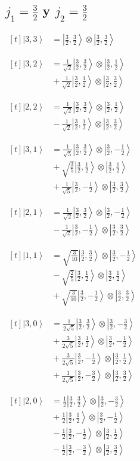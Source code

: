\documentclass[11pt,a4paper]{article}
\newcommand{\estadocelda}[1]{%
  \begin{minipage}[t]{0.48\linewidth}
  \small\raggedright
  \(\displaystyle\begin{aligned}[t]#1\end{aligned}\)
  \end{minipage}%
}
\newcommand{\ket}[1]{\left|#1\right\rangle}
\begin{document}
\subsection{\texorpdfstring{$j_1=\frac{3}{2}$ y $j_2=\frac{3}{2}$}{j1=3/2 y j2=3/2}}

\noindent\estadocelda{
\ket{3,3} &= \ket{\frac{3}{2},\frac{3}{2}}\otimes\ket{\frac{3}{2},\frac{3}{2}}
}\hfill\estadocelda{
\ket{3,2} &= \frac{1}{\sqrt{2}}\ket{\frac{3}{2},\frac{3}{2}}\otimes\ket{\frac{3}{2},\frac{1}{2}} \\
 &{}+\frac{1}{\sqrt{2}}\ket{\frac{3}{2},\frac{1}{2}}\otimes\ket{\frac{3}{2},\frac{3}{2}}
}\par\addvspace{1.4em}

\noindent\estadocelda{
\ket{2,2} &= \frac{1}{\sqrt{2}}\ket{\frac{3}{2},\frac{3}{2}}\otimes\ket{\frac{3}{2},\frac{1}{2}} \\
 &{}-\frac{1}{\sqrt{2}}\ket{\frac{3}{2},\frac{1}{2}}\otimes\ket{\frac{3}{2},\frac{3}{2}}
}\hfill\estadocelda{
\ket{3,1} &= \frac{1}{\sqrt{5}}\ket{\frac{3}{2},\frac{3}{2}}\otimes\ket{\frac{3}{2},-\frac{1}{2}} \\
 &{}+\sqrt{\frac{3}{5}}\ket{\frac{3}{2},\frac{1}{2}}\otimes\ket{\frac{3}{2},\frac{1}{2}} \\
 &{}+\frac{1}{\sqrt{5}}\ket{\frac{3}{2},-\frac{1}{2}}\otimes\ket{\frac{3}{2},\frac{3}{2}}
}\par\addvspace{1.4em}

\noindent\estadocelda{
\ket{2,1} &= \frac{1}{\sqrt{2}}\ket{\frac{3}{2},\frac{3}{2}}\otimes\ket{\frac{3}{2},-\frac{1}{2}} \\
 &{}-\frac{1}{\sqrt{2}}\ket{\frac{3}{2},-\frac{1}{2}}\otimes\ket{\frac{3}{2},\frac{3}{2}}
}\hfill\estadocelda{
\ket{1,1} &= \sqrt{\frac{3}{10}}\ket{\frac{3}{2},\frac{3}{2}}\otimes\ket{\frac{3}{2},-\frac{1}{2}} \\
 &{}-\sqrt{\frac{2}{5}}\ket{\frac{3}{2},\frac{1}{2}}\otimes\ket{\frac{3}{2},\frac{1}{2}} \\
 &{}+\sqrt{\frac{3}{10}}\ket{\frac{3}{2},-\frac{1}{2}}\otimes\ket{\frac{3}{2},\frac{3}{2}}
}\par\addvspace{1.4em}

\noindent\estadocelda{
\ket{3,0} &= \frac{1}{2\sqrt{5}}\ket{\frac{3}{2},\frac{3}{2}}\otimes\ket{\frac{3}{2},-\frac{3}{2}} \\
 &{}+\frac{3}{2\sqrt{5}}\ket{\frac{3}{2},\frac{1}{2}}\otimes\ket{\frac{3}{2},-\frac{1}{2}} \\
 &{}+\frac{3}{2\sqrt{5}}\ket{\frac{3}{2},-\frac{1}{2}}\otimes\ket{\frac{3}{2},\frac{1}{2}} \\
 &{}+\frac{1}{2\sqrt{5}}\ket{\frac{3}{2},-\frac{3}{2}}\otimes\ket{\frac{3}{2},\frac{3}{2}}
}\hfill\estadocelda{
\ket{2,0} &= \frac{1}{2}\ket{\frac{3}{2},\frac{3}{2}}\otimes\ket{\frac{3}{2},-\frac{3}{2}} \\
 &{}+\frac{1}{2}\ket{\frac{3}{2},\frac{1}{2}}\otimes\ket{\frac{3}{2},-\frac{1}{2}} \\
 &{}-\frac{1}{2}\ket{\frac{3}{2},-\frac{1}{2}}\otimes\ket{\frac{3}{2},\frac{1}{2}} \\
 &{}-\frac{1}{2}\ket{\frac{3}{2},-\frac{3}{2}}\otimes\ket{\frac{3}{2},\frac{3}{2}}
}\par\addvspace{1.4em}
\end{document}

